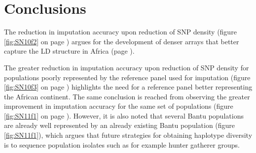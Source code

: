 \section{Conclusions}

The reduction in imputation accuracy upon reduction of \gls{SNP} density (figure \ref{fig:SN10f2} on page \pageref{fig:SN10f2}) argues for the development of denser arrays that better capture the \gls{LD} structure in Africa (page \pageref{ch:chip_design}).

The greater reduction in imputation accuracy upon reduction of \gls{SNP} density for populations poorly represented by the reference panel used for imputation (figure \ref{fig:SN10f3} on page \pageref{fig:SN10f3}) highlights the need for a reference panel better representing the African continent. The same conclusion is reached from observing the greater improvement in imputation accuracy for the same set of populations (figure \ref{fig:SN11f1} on page \pageref{fig:SN11f1}). However, it is also noted that several Bantu populations are already well represented by an already existing Bantu population (figure \ref{fig:SN11f1}), which argues that future strategies for obtaining haplotype diversity is to sequence population isolates such as for example hunter gatherer groups.